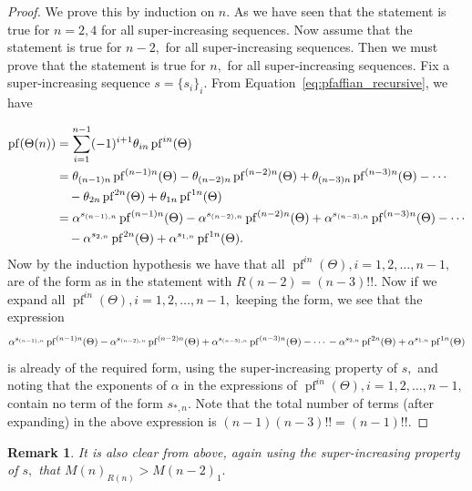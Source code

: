 \documentclass[9pt, BCOR=2mm]{amsart}
\numberwithin{equation}{section}
\numberwithin{equation}{section}
\newtheorem{remark}[theorem]{Remark}
\begin{document}
	
	\begin{proof}
		We prove this by induction on $n.$ As we have seen that the statement is true for $n=2,4$ for all super-increasing sequences. Now assume that the statement is true for $n-2,$ for all super-increasing sequences. Then we must prove that the statement is true for $n,$ for all super-increasing sequences. Fix a super-increasing sequence $s=\{s_i\}_i.$ From Equation~\ref{eq:pfaffian_recursive}, we have
		
		\begin{align*}
			\operatorname{pf}(\Theta(n))&=\sum_{i=1}^{n-1}(-1)^{i+1} \theta_{i n} \operatorname{pf}^{i n}(\Theta)\\
			&= \theta_{(n-1) n} \operatorname{pf}^{(n-1) n}(\Theta)-\theta_{(n-2) n} \operatorname{pf}^{(n-2) n}(\Theta)+\theta_{(n-3) n} \operatorname{pf}^{(n-3) n}(\Theta)-\cdots\\&\quad -\theta_{2 n} \operatorname{pf}^{2 n}(\Theta)+\theta_{1 n} \operatorname{pf}^{1 n}(\Theta)\\
			&= \alpha^{s_{(n-1), n}} \operatorname{pf}^{(n-1) n}(\Theta)-\alpha^{s_{(n-2), n}} \operatorname{pf}^{(n-2) n}(\Theta)+\alpha^{s_{(n-3), n}} \operatorname{pf}^{(n-3) n}(\Theta)-\cdots\\&\textcolor{red}\quad-\alpha^{s_{2, n}} \operatorname{pf}^{2 n}(\Theta)+\alpha^{s_{1, n}} \operatorname{pf}^{1 n}(\Theta).
		\end{align*}
		Now by the induction hypothesis we have that all $\operatorname{pf}^{i n}(\Theta), i=1,2, \ldots ,n-1,$ are of the form as in the statement with $R(n-2)=(n-3)!!.$ Now if we expand all $\operatorname{pf}^{i n}(\Theta), i=1,2, \ldots,n-1,$ keeping the form, we see that the expression $$\alpha^{s_{(n-1), n}} \operatorname{pf}^{(n-1) n}(\Theta)-\alpha^{s_{(n-2), n}} \operatorname{pf}^{(n-2) n}(\Theta)+\alpha^{s_{(n-3), n}} \operatorname{pf}^{(n-3) n}(\Theta)-\cdots\\-\alpha^{s_{2, n}} \operatorname{pf}^{2 n}(\Theta)+\alpha^{s_{1, n}} \operatorname{pf}^{1 n}(\Theta)$$ is already of the required form, using the super-increasing property of $s,$ and noting that the  exponents of $\alpha$ in the expressions of $\operatorname{pf}^{i n}(\Theta), i=1,2, \ldots ,n-1,$ contain no term of the form $s_{*,n}.$
		Note that the total number of terms (after expanding) in the above expression is $(n-1)(n-3)!!=(n-1)!!.$
	\end{proof}
	


\begin{remark}\label{rem:M_n>}
	It is also clear from above, again using the super-increasing property of $s,$ that $M(n)_{R(n)}>M(n-2)_1.$
\end{remark}
\end{document}
